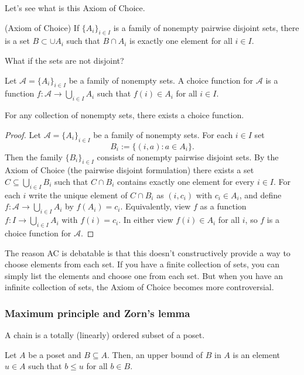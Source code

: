 Let's see what is this Axiom of Choice.

(Axiom of Choice) If $\{A_i\}_{i\in I}$ is a family of nonempty pairwise disjoint sets, there is a set $B\subset\cup A_i$ such that $B\cap A_i$ is exactly one element for all $i\in I$.

What if the sets are not disjoint?

\begin{definition}
  Let $\mathcal{A}=\{A_i\}_{i\in I}$ be a family of nonempty sets. A choice function for $\mathcal{A}$ is a function $f:\mathcal{A}\to \bigcup_{i\in I} A_i$ such that $f(i)\in A_i$ for all $i\in I$.
\end{definition}
\begin{proposition}
  For any collection of nonempty sets, there exists a choice function.
\end{proposition}
\begin{proof}
Let \(\mathcal{A}=\{A_i\}_{i\in I}\) be a family of nonempty sets. For each \(i\in I\) set
\[
B_i:=\{(i,a):a\in A_i\}.
\]
Then the family \(\{B_i\}_{i\in I}\) consists of nonempty pairwise disjoint sets. By the Axiom of Choice (the pairwise disjoint formulation) there exists a set \(C\subseteq\bigcup_{i\in I}B_i\) such that \(C\cap B_i\) contains exactly one element for every \(i\in I\). For each \(i\) write the unique element of \(C\cap B_i\) as \((i,c_i)\) with \(c_i\in A_i\), and define \(f:\mathcal{A}\to\bigcup_{i\in I}A_i\) by \(f(A_i)=c_i\). Equivalently, view \(f\) as a function \(f:I\to\bigcup_{i\in I}A_i\) with \(f(i)=c_i\). In either view \(f(i)\in A_i\) for all \(i\), so \(f\) is a choice function for \(\mathcal{A}\).
\end{proof}

The reason AC is debatable is that this doesn't constructively provide a way to choose elements from each set. If you have a finite collection of sets, you can simply list the elements and choose one from each set. But when you have an infinite collection of sets, the Axiom of Choice becomes more controversial.

\subsubsection{Maximum principle and Zorn's lemma}

\begin{definition}
  A chain is a totally (linearly) ordered subset of a poset. 
\end{definition}
\begin{definition}
  Let $A$ be a poset and $B\subseteq A$. Then, an upper bound of $B$ in $A$ is an element $u\in A$ such that $b\leq u$ for all $b\in B$.
\end{definition}


